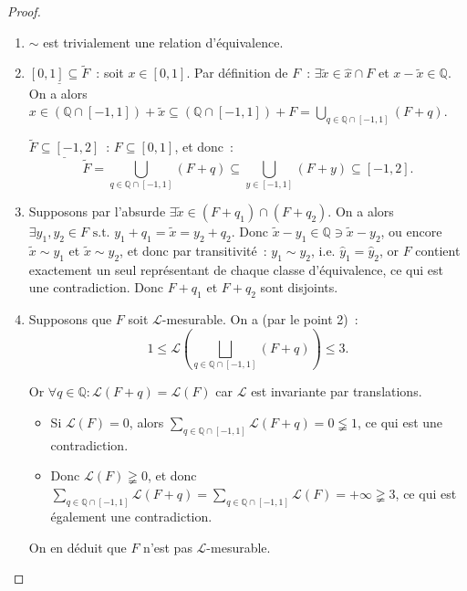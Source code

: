 \documentclass{article}
\newcommand{\pinfty}{{+\infty}}
\newcommand{\st}{\text{ s.t. }}
\newcommand{\Q}{{\mathbb Q}}
\begin{document}
\begin{proof}~
\begin{enumerate}
	\item $\sim$ est trivialement une relation d'équivalence.
	\item $\underline {[0, 1] \subseteq \tilde F}$~: soit $x \in [0, 1]$. Par définition de $F$~: $\exists \tilde x \in \hat x \cap F$ et $x-\tilde x \in \Q$.
	On a alors $x \in (\Q \cap [-1, 1]) + \tilde x \subseteq (\Q \cap [-1, 1]) + F = \bigcup_{q \in \Q \cap [-1, 1]}(F+q)$.

	$\underline {\tilde F \subseteq [-1, 2]}$~: $F \subseteq [0, 1]$, et donc~:
	\[\tilde F = \bigcup_{q \in \Q \cap [-1, 1]}(F+q) \subseteq \bigcup_{y \in [-1, 1]}(F+y) \subseteq [-1, 2].\]
	\item Supposons par l'absurde $\exists \tilde x \in (F+q_1) \cap (F+q_2)$. On a alors $\exists y_1, y_2 \in F \st y_1+q_1 = \tilde x = y_2+q_2$. Donc
	$\tilde x - y_1 \in \Q \ni \tilde x - y_2$, ou encore $\tilde x \sim y_1$ et $\tilde x \sim y_2$, et donc par transitivité~: $y_1 \sim y_2$, i.e. $\hat y_1 = \hat y_2$,
	or $F$ contient exactement un seul représentant de chaque classe d'équivalence, ce qui est une contradiction. Donc $F+q_1$ et $F+q_2$ sont disjoints.
	\item Supposons que $F$ soit $\mathcal L$-mesurable. On a (par le point 2)~:
	\[1 \leq \mathcal L\left(\bigsqcup_{q \in \Q \cap [-1, 1]}(F+q)\right) \leq 3.\]

	Or $\forall q \in \Q : \mathcal L(F+q) = \mathcal L(F)$ car $\mathcal L$ est invariante par translations.
	\begin{itemize}
		\item Si $\mathcal L(F) = 0$, alors $\sum_{q \in \Q \cap [-1, 1]}\mathcal L(F+q) = 0 \lneqq 1$, ce qui est une contradiction.
		\item Donc $\mathcal L(F) \gneqq 0$, et donc $\sum_{q \in \Q \cap [-1, 1]}\mathcal L(F+q) = \sum_{q \in \Q \cap [-1, 1]}\mathcal L(F) = \pinfty \gneqq 3$, ce qui est également
		une contradiction.
	\end{itemize}

	On en déduit que $F$ n'est pas $\mathcal L$-mesurable.
\end{enumerate}
\end{proof}
\end{document}
